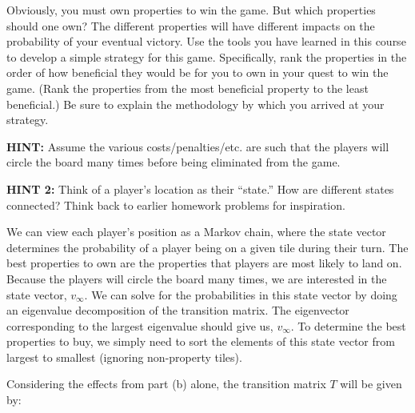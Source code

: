 \documentclass[fleqn]{article}
\begin{document}
\begin{enumerate}[nolistsep]
\begin{enumerate}
			Obviously, you must own properties to win the game. But which properties should one own? The different properties will have different impacts on the probability of your eventual victory. Use the tools you have learned in this course to develop a simple strategy for this game. Specifically, rank the properties in the order of how beneficial they would be for you to own in your quest to win the game. (Rank the properties from the most beneficial property to the least beneficial.) Be sure to explain the methodology by which you arrived at your strategy.
			
			\textbf{HINT:} Assume the various costs/penalties/etc. are such that the players will circle the board many times before being eliminated from the game.
			
			\textbf{HINT 2:} Think of a player’s location as their “state.” How are different states connected? Think back to earlier homework problems for inspiration.
			
			We can view each player's position as a Markov chain, where the state vector determines the probability of a player being on a given tile during their turn. The best properties to own are the properties that players are most likely to land on. Because the players will circle the board many times, we are interested in the state vector, $v_{\infty}$. We can solve for the probabilities in this state vector by doing an eigenvalue decomposition of the transition matrix. The eigenvector corresponding to the largest eigenvalue should give us, $v_\infty$. To determine the best properties to buy, we simply need to sort the elements of this state vector from largest to smallest (ignoring non-property tiles).
			
			Considering the effects from part (b) alone, the transition matrix $T$ will be given by:
			

\end{enumerate}
\end{enumerate}
\end{document}

